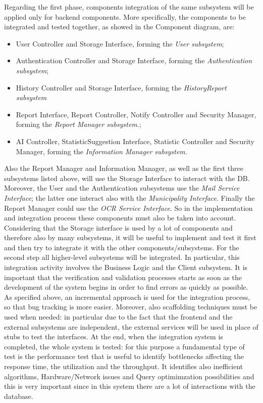 \documentclass{report}
\begin{document}
Regarding the first phase, components integration of the same subsystem will be applied only for backend components. More specifically, the components to be integrated and tested together, as showed in the Component diagram, are:
\begin{itemize}
\item User Controller and Storage Interface, forming the \textit{User subsystem};
\item Authentication Controller and Storage Interface, forming the \textit{Authentication subsystem};
\item History Controller and Storage Interface, forming the \textit{HistoryReport subsystem}
\item Report Interface, Report Controller, Notify Controller and Security Manager, forming the \textit{Report Manager subsystem}.;
\item AI Controller, StatisticSuggestion Interface, Statistic Controller and Security Manager, forming the \textit{Information Manager subsystem}.
\end{itemize}
Also the Report Manager and Information Manager, as well as the first three subsystems listed above, will use the Storage Interface to interact with the DB. Moreover, the User and the Authentication subsystems use the \textit{Mail Service Interface}; the latter one interact also with the \textit{Municipality Interface}. Finally the Report Manager could use the \textit{OCR Service Interface}. So in the implementation and integration process these components must also be taken into account. 
Considering that the Storage interface is used by a lot of components and therefore also by many subsystems, it will be useful to implement and test it first and then try to integrate it with the other components/subsystems. 
\newline
\newline
For the second step all higher-level subsystems will be integrated. In particular, this integration activity involves the Business Logic and the Client subsystem.
\newline
It is important that the verification and validation processes starts as soon as the development of the system begins in order to find errors as quickly as possible. As specified above, an incremental approach is used for the integration process, so that bug tracking is more easier. Moreover, also scaffolding techniques must be used when needed: in particular due to the fact that the frontend and the external subsystems are independent, the external services will be used in place of stubs to test the interfaces.
\newline
At the end, when the integration system is completed, the whole system is tested: for this purpose a fundamental type of test is the performance test that is useful to identify bottlenecks affecting the response time, the utilization and the throughput. It identifies also inefficient algorithms, Hardware/Network issues and Query optimimzation possibilities and this is very important since in this system there are a lot of interactions with the database. 
\newpage
\end{document}
